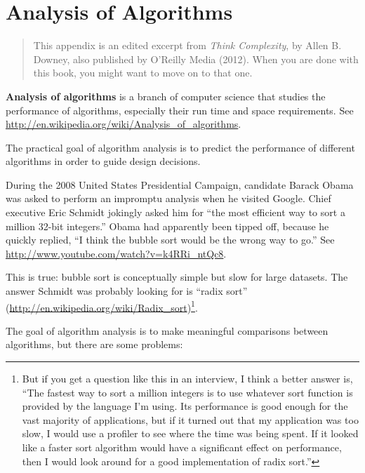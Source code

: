 \documentclass[10pt]{book}
\begin{document}
\chapter{Analysis of Algorithms}
\label{algorithms}

\begin{quote}
This appendix is an edited excerpt from {\it Think Complexity}, by
Allen B. Downey, also published by O'Reilly Media (2012).  When you
are done with this book, you might want to move on to that one.
\end{quote}

{\bf Analysis of algorithms} is a branch of computer science that
studies the performance of algorithms, especially their run time and
space requirements.  See
\url{http://en.wikipedia.org/wiki/Analysis_of_algorithms}.
 

The practical goal of algorithm analysis is to predict the performance
of different algorithms in order to guide design decisions.

During the 2008 United States Presidential Campaign, candidate
Barack Obama was asked to perform an impromptu analysis when
he visited Google.  Chief executive Eric Schmidt jokingly asked him
for ``the most efficient way to sort a million 32-bit integers.''
Obama had apparently been tipped off, because he quickly
replied, ``I think the bubble sort would be the wrong way to go.''
See \url{http://www.youtube.com/watch?v=k4RRi_ntQc8}.

This is true: bubble sort is conceptually simple but slow for
large datasets.  The answer Schmidt was probably looking for is
``radix sort'' (\url{http://en.wikipedia.org/wiki/Radix_sort})\footnote{
But if you get a question like this in an interview, I think
a better answer is, ``The fastest way to sort a million integers
is to use whatever sort function is provided by the language
I'm using.  Its performance is good enough for the vast majority
of applications, but if it turned out that my application was too
slow, I would use a profiler to see where the time was being
spent.  If it looked like a faster sort algorithm would have
a significant effect on performance, then I would look
around for a good implementation of radix sort.''}.

The goal of algorithm analysis is to make meaningful
comparisons between algorithms, but there are some problems:
\end{document}

